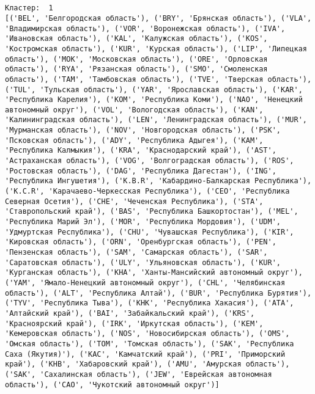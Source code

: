 \documentclass[11pt]{article}
\begin{document}
    \begin{center}
    \end{center}
    { \hspace*{\fill} \\}
    
    \begin{Verbatim}[commandchars=\\\{\}]

Кластер:  1
[('BEL', 'Белгородская область'), ('BRY', 'Брянская область'), ('VLA', 'Владимирская область'), ('VOR', 'Воронежская область'), ('IVA', 'Ивановская область'), ('KAL', 'Калужская область'), ('KOS', 'Костромская область'), ('KUR', 'Курская область'), ('LIP', 'Липецкая область'), ('MOK', 'Московская область'), ('ORE', 'Орловская область'), ('RYA', 'Рязанская область'), ('SMO', 'Смоленская область'), ('TAM', 'Тамбовская область'), ('TVE', 'Тверская область'), ('TUL', 'Тульская область'), ('YAR', 'Ярославская область'), ('KAR', 'Республика Карелия'), ('KOM', 'Республика Коми'), ('NAO', 'Ненецкий автономный округ'), ('VOL', 'Вологодская область'), ('KAN', 'Калинингpадская область'), ('LEN', 'Ленинградская область'), ('MUR', 'Мурманская область'), ('NOV', 'Новгородская область'), ('PSK', 'Псковская область'), ('ADY', 'Республика Адыгея'), ('KAM', 'Республика Калмыкия'), ('KRA', 'Краснодарский край'), ('AST', 'Астраханская область'), ('VOG', 'Волгоградская область'), ('ROS', 'Ростовская область'), ('DAG', 'Республика Дагестан'), ('ING', 'Республика Ингушетия'), ('K.B.R', 'Кабардино-Балкарская Республика'), ('K.C.R', 'Карачаево-Черкесская Республика'), ('CEO', 'Республика Северная Осетия'), ('CHE', 'Чеченская Республика'), ('STA', 'Ставропольский край'), ('BAS', 'Республика Башкортостан'), ('MEL', 'Республика Марий Эл'), ('MOR', 'Республика Мордовия'), ('UDM', 'Удмуртская Республика'), ('CHU', 'Чувашская Республика'), ('KIR', 'Кировская область'), ('ORN', 'Оренбургская область'), ('PEN', 'Пензенская область'), ('SAM', 'Самарская область'), ('SAR', 'Саратовская область'), ('ULY', 'Ульяновская область'), ('KUR', 'Курганская область'), ('KHA', 'Ханты-Мансийский автономный округ'), ('YAM', 'Ямало-Ненецкий автономный округ'), ('CHL', 'Челябинская область'), ('ALT', 'Республика Алтай'), ('BUR', 'Республика Бурятия'), ('TYV', 'Республика Тыва'), ('KHK', 'Республика Хакасия'), ('ATA', 'Алтайский край'), ('BAI', 'Забайкальский край'), ('KRS', 'Красноярский край'), ('IRK', 'Иркутская область'), ('KEM', 'Кемеровская область'), ('NOS', 'Новосибирская область'), ('OMS', 'Омская область'), ('TOM', 'Томская область'), ('SAK', 'Республика Саха (Якутия)'), ('KAC', 'Камчатский край'), ('PRI', 'Приморский край'), ('KHB', 'Хабаровский край'), ('AMU', 'Амурская область'), ('SAK', 'Сахалинская область'), ('JEW', 'Еврейская автономная область'), ('CAO', 'Чукотский автономный округ')]


\end{Verbatim}
\end{document}
